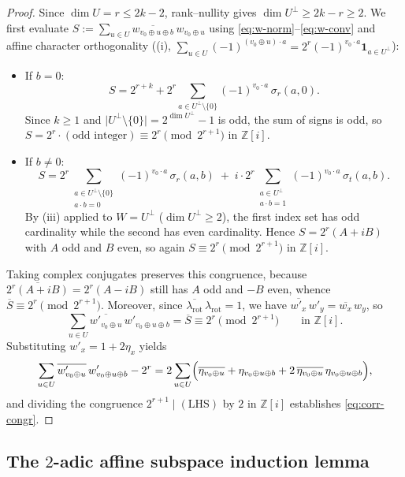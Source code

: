\documentclass[11pt,a4paper]{article}
\theoremstyle{plain}
\theoremstyle{definition}
\theoremstyle{remark}
\newcommand{\Zi}{\mathbb{Z}[i]}
\newcommand{\abs}[1]{\lvert#1\rvert}
\newcommand{\indic}[1]{\mathbf{1}_{#1}}
\numberwithin{equation}{section}
\begin{document}
\begin{proof}
Since $\dim U = r \le 2k - 2$, rank--nullity gives $\dim U^\perp \ge 2k - r \ge 2$. We first evaluate $S := \sum_{u \in U} \overline{w_{v_0 \oplus u \oplus b}}\,w_{v_0 \oplus u}$ using \eqref{eq:w-norm}--\eqref{eq:w-conv} and affine character orthogonality ((i), $\sum_{u \in U} (-1)^{(v_0 \oplus u)\cdot a} = 2^r (-1)^{v_0 \cdot a}\indic{a \in U^\perp}$):
\begin{itemize}[leftmargin=1.8em]
  \item If $b = 0$:
  \[
    S = 2^{r+k} + 2^r \sum_{a \in U^\perp \setminus \{0\}} (-1)^{v_0 \cdot a}\,\sigma_r(a, 0).
  \]
  Since $k \ge 1$ and $\abs{U^\perp \setminus \{0\}} = 2^{\dim U^\perp} - 1$ is odd, the sum of signs is odd, so $S = 2^r \cdot (\text{odd integer}) \equiv 2^r \pmod{2^{r+1}}$ in $\Zi$.
  \item If $b \neq 0$:
  \[
    S = 2^r \sum_{\substack{a \in U^\perp \setminus \{0\} \\ a \cdot b = 0}} (-1)^{v_0 \cdot a}\,\sigma_r(a, b)
      \;+\; i \cdot 2^r \sum_{\substack{a \in U^\perp \\ a \cdot b = 1}} (-1)^{v_0 \cdot a}\,\sigma_t(a, b).
  \]
  By (iii) applied to $W = U^\perp$ ($\dim U^\perp \ge 2$), the first index set has odd cardinality while the second has even cardinality. Hence $S = 2^r(A + iB)$ with $A$ odd and $B$ even, so again $S \equiv 2^r \pmod{2^{r+1}}$ in $\Zi$.
\end{itemize}
Taking complex conjugates preserves this congruence, because $\overline{2^r(A + iB)} = 2^r(A - iB)$ still has $A$ odd and $-B$ even, whence $\overline{S} \equiv 2^r \pmod{2^{r+1}}$. Moreover, since $\overline{\lambda_{\mathrm{rot}}}\,\lambda_{\mathrm{rot}} = 1$, we have $\overline{w'_x}\,w'_y = \overline{w_x}\,w_y$, so
\[
  \sum_{u \in U} \overline{w'_{v_0 \oplus u}}\,w'_{v_0 \oplus u \oplus b} = \overline{S} \equiv 2^r \pmod{2^{r+1}} \qquad \text{in } \Zi.
\]
Substituting $w'_x = 1 + 2\eta_x$ yields
\[
  \sum_{u \in U} \overline{w'_{v_0 \oplus u}}\,w'_{v_0 \oplus u \oplus b} - 2^r
  = 2 \sum_{u \in U} \Bigl(\overline{\eta_{v_0 \oplus u}} + \eta_{v_0 \oplus u \oplus b} + 2\,\overline{\eta_{v_0 \oplus u}}\,\eta_{v_0 \oplus u \oplus b}\Bigr),
\]
and dividing the congruence $2^{r+1} \mid (\text{LHS})$ by $2$ in $\Zi$ establishes \eqref{eq:corr-congr}.
\end{proof}

\subsection{The \texorpdfstring{$2$}{2}-adic affine subspace induction lemma}\label{sec:induction}
\end{document}
